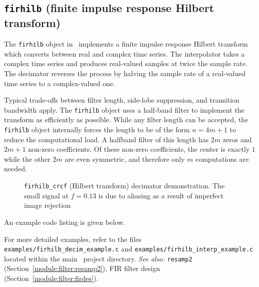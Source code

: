 % 
%
\subsection{{\tt firhilb} (finite impulse response Hilbert transform)}
\label{module:filter:firhilb}
The {\tt firhilb} object in \liquid\ implements a finite impulse
response Hilbert transform which
converts between real and complex time series.
The interpolator takes a complex time series and produces real-valued
samples at twice the sample rate.
The decimator reverses the process by halving the sample rate of a
real-valued time series to a complex-valued one.

Typical trade-offs between filter length, side-lobe suppression, and
transition bandwidth apply.
The {\tt firhilb} object uses a half-band filter to implement the
transform as efficiently as possible.
While any filter length can be accepted, the {\tt firhilb} object
internally forces the length to be of the form $n=4m+1$
to reduce the computational load.
A halfband filter of this length has $2m$ zeros and $2m+1$ non-zero
coefficients.
Of these non-zero coefficients, the center is exactly $1$ while the other $2m$
are even symmetric, and therefore only $m$ computations are needed.
%
\begin{figure}
\centering
{}
\caption{{\tt firhilb\_crcf} (Hilbert transform) decimator demonstration. The
small signal at $f=0.13$ is due to aliasing as a result of imperfect image
rejection}
\label{fig:module:filter:firhilb_crcf}
\end{figure}
%
An example code listing is given below.
%

%
For more detailed examples, refer to the files
{\tt examples/firhilb\_decim\_example.c} and
{\tt examples/firhilb\_interp\_example.c}
located within the main \liquid\ project directory.
%
{\it See also:} {\tt resamp2} (Section~\ref{module:filter:resamp2}),
FIR filter design (Section~\ref{module:filter:firdes}).


% 
%

% 
%
